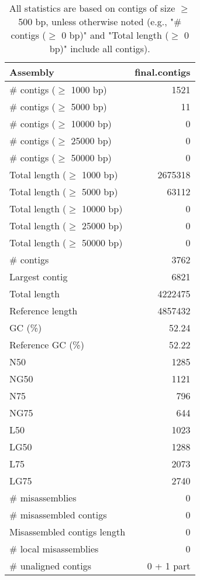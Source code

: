 \documentclass[12pt,a4paper]{article}
\begin{document}
\begin{table}[ht]
\begin{center}
\caption{All statistics are based on contigs of size $\geq$ 500 bp, unless otherwise noted (e.g., "\# contigs ($\geq$ 0 bp)" and "Total length ($\geq$ 0 bp)" include all contigs).}
\begin{tabular}{|l*{1}{|r}|}
\hline
Assembly & final.contigs \\ \hline
\# contigs ($\geq$ 1000 bp) & 1521 \\ \hline
\# contigs ($\geq$ 5000 bp) & 11 \\ \hline
\# contigs ($\geq$ 10000 bp) & 0 \\ \hline
\# contigs ($\geq$ 25000 bp) & 0 \\ \hline
\# contigs ($\geq$ 50000 bp) & 0 \\ \hline
Total length ($\geq$ 1000 bp) & 2675318 \\ \hline
Total length ($\geq$ 5000 bp) & 63112 \\ \hline
Total length ($\geq$ 10000 bp) & 0 \\ \hline
Total length ($\geq$ 25000 bp) & 0 \\ \hline
Total length ($\geq$ 50000 bp) & 0 \\ \hline
\# contigs & 3762 \\ \hline
Largest contig & 6821 \\ \hline
Total length & 4222475 \\ \hline
Reference length & 4857432 \\ \hline
GC (\%) & 52.24 \\ \hline
Reference GC (\%) & 52.22 \\ \hline
N50 & 1285 \\ \hline
NG50 & 1121 \\ \hline
N75 & 796 \\ \hline
NG75 & 644 \\ \hline
L50 & 1023 \\ \hline
LG50 & 1288 \\ \hline
L75 & 2073 \\ \hline
LG75 & 2740 \\ \hline
\# misassemblies & 0 \\ \hline
\# misassembled contigs & 0 \\ \hline
Misassembled contigs length & 0 \\ \hline
\# local misassemblies & 0 \\ \hline
\# unaligned contigs & 0 + 1 part \\ \hline

\end{tabular}
\end{center}
\end{table}
\end{document}
